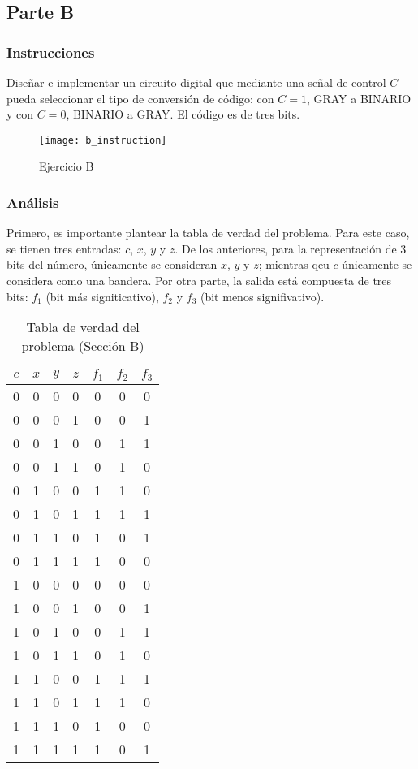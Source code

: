 \documentclass[../procedimientos.tex]{subfiles}
\begin{document}
\clearpage
\subsection{Parte B}
\subsubsection{Instrucciones}
Diseñar e implementar un circuito digital que mediante una señal de control 
$C$ pueda seleccionar el tipo de conversión de código: con $C=1$, GRAY a 
BINARIO y con $C=0$, BINARIO a GRAY. El código es de tres bits.
\begin{figure}[H]
  \centering
  \texttt{[image: b\_instruction]}
  \caption{Ejercicio B}
  \label{fig:b_inst}
\end{figure}

\subsubsection{Análisis}
Primero, es importante plantear la tabla de verdad del problema. Para este 
caso, se tienen  tres entradas: $c$, $x$, $y$ y $z$. De los anteriores, para 
la representación de 3 bits del número, únicamente se consideran $x$, $y$ y 
$z$; mientras qeu $c$ únicamente se considera como una bandera. Por otra 
parte, la salida está compuesta de tres bits: $f_1$ (bit más signiticativo), 
$f_2$ y $f_3$ (bit menos signifivativo).

\begin{table}[H]
  \centering
  \begin{tabular}{cccc|ccc}
    \hline
    $c$ & $x$ & $y$ & $z$ & $f_1$ & $f_2$ & $f_3$\\
    \hline
    0 & 0 & 0 & 0 & 0 & 0 & 0\\
    0 & 0 & 0 & 1 & 0 & 0 & 1\\
    0 & 0 & 1 & 0 & 0 & 1 & 1\\
    0 & 0 & 1 & 1 & 0 & 1 & 0\\
    0 & 1 & 0 & 0 & 1 & 1 & 0\\
    0 & 1 & 0 & 1 & 1 & 1 & 1\\
    0 & 1 & 1 & 0 & 1 & 0 & 1\\
    0 & 1 & 1 & 1 & 1 & 0 & 0\\
    1 & 0 & 0 & 0 & 0 & 0 & 0\\
    1 & 0 & 0 & 1 & 0 & 0 & 1\\
    1 & 0 & 1 & 0 & 0 & 1 & 1\\
    1 & 0 & 1 & 1 & 0 & 1 & 0\\
    1 & 1 & 0 & 0 & 1 & 1 & 1\\
    1 & 1 & 0 & 1 & 1 & 1 & 0\\
    1 & 1 & 1 & 0 & 1 & 0 & 0\\
    1 & 1 & 1 & 1 & 1 & 0 & 1\\
    \hline
  \end{tabular}
  \caption{Tabla de verdad del problema (Sección B)}
  \label{tab:tv_b}
\end{table}
\end{document}
